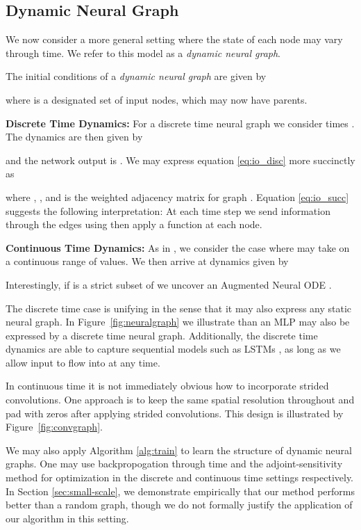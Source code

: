 \documentclass{article}
\begin{document}
\subsection{Dynamic Neural Graph} \label{sec:dyn}




We now consider a more general setting where the state of each node  may vary through time. We refer to this model as a \textit{dynamic neural graph}. 


The initial conditions of a \textit{dynamic neural graph} are given by

where  is a designated set of input nodes, which may now have parents. 
\begin{mdframed}
\textbf{Discrete Time Dynamics:} For a discrete time neural graph we consider times . The dynamics are then given by

and the network output is .
We may express equation \ref{eq:io_disc} more succinctly as

where , , and  is the weighted adjacency matrix for graph . Equation \ref{eq:io_succ} suggests the following interpretation: At each time step we send information through the edges using  then apply a function at each node.
\end{mdframed}
\begin{mdframed}
\textbf{Continuous Time Dynamics:} As in \cite{node}, we consider the case where  may take on a continuous range of values. We then arrive at dynamics given by

Interestingly, if  is a strict subset of  we uncover an Augmented Neural ODE \cite{anode}.
\end{mdframed}
The discrete time case is unifying in the sense that it may also express any static neural graph. In Figure~\ref{fig:neuralgraph} we illustrate than an MLP may also be expressed by a discrete time neural graph. Additionally, the discrete time dynamics are able to capture sequential models such as LSTMs \cite{lstm}, as long as we allow input to flow into  at any time.

In continuous time it is not immediately obvious how to incorporate strided convolutions. One approach is to keep the same spatial resolution throughout and pad with zeros after applying strided convolutions. This design is illustrated by Figure~\ref{fig:convgraph}.

We may also apply Algorithm \ref{alg:train} to learn the structure of dynamic neural graphs. One may use backpropogation through time \cite{bptt} and the adjoint-sensitivity method \cite{node} for optimization in the discrete and continuous time settings respectively. In Section \ref{sec:small-scale}, we demonstrate empirically that our method performs better than a random graph, though we do not formally justify the application of our algorithm in this setting.
\end{document}
